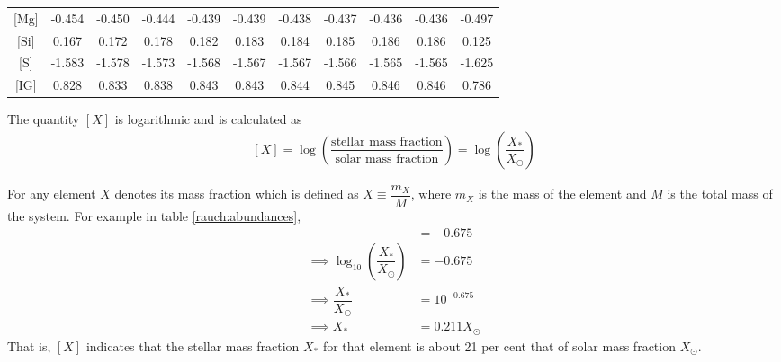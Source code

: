 \begin{table}[h!]
\begin{tabular}{ccccccccccc}
						{[}Mg{]} & \multicolumn{1}{c}{-0.454} & \multicolumn{1}{c}{-0.450} & \multicolumn{1}{c}{-0.444} & \multicolumn{1}{c}{-0.439} & \multicolumn{1}{c}{-0.439} & \multicolumn{1}{c}{-0.438} & \multicolumn{1}{c}{-0.437} & \multicolumn{1}{c}{-0.436} & \multicolumn{1}{c}{-0.436} & -0.497 \\ %
						{[}Si{]} & \multicolumn{1}{c}{0.167} & \multicolumn{1}{c}{0.172} & \multicolumn{1}{c}{0.178} & \multicolumn{1}{c}{0.182} & \multicolumn{1}{c}{0.183} & \multicolumn{1}{c}{0.184} & \multicolumn{1}{c}{0.185} & \multicolumn{1}{c}{0.186} & \multicolumn{1}{c}{0.186} & 0.125 \\ %
						{[}S{]} & \multicolumn{1}{c}{-1.583} & \multicolumn{1}{c}{-1.578} & \multicolumn{1}{c}{-1.573} & \multicolumn{1}{c}{-1.568} & \multicolumn{1}{c}{-1.567} & \multicolumn{1}{c}{-1.567} & \multicolumn{1}{c}{-1.566} & \multicolumn{1}{c}{-1.565} & \multicolumn{1}{c}{-1.565} & -1.625 \\ %
						{[}IG{]} & \multicolumn{1}{c}{0.828} & \multicolumn{1}{c}{0.833} & \multicolumn{1}{c}{0.838} & \multicolumn{1}{c}{0.843} & \multicolumn{1}{c}{0.843} & \multicolumn{1}{c}{0.844} & \multicolumn{1}{c}{0.845} & \multicolumn{1}{c}{0.846} & \multicolumn{1}{c}{0.846} & 0.786 \\ \hline
					\end{tabular}
				\end{table}
				
				The quantity $[X]$ is logarithmic and is calculated as
				\begin{align}
					\label{rauch:[X]}
					[X]=\log{\left(\dfrac{\text{stellar mass fraction}}{\text{solar mass fraction}}\right)}=\log{\left(\dfrac{X_*}{X_\odot}\right)}
				\end{align}
				
				For any element $X$ denotes its mass fraction which is defined as $X\equiv\dfrac{m_X}{M}$, where $m_X$ is the mass of the element and $M$ is the total mass of the system. For example in table \ref{rauch:abundances},
				\begin{align*}
					[X]&=-0.675 \\
					\implies \log_{10}\left(\dfrac{X_*}{X_\odot}\right)&=-0.675 \\
					\implies \dfrac{X_*}{X_\odot}&=10^{-0.675} \\
					\implies X_*&=0.211X_\odot
				\end{align*}
				That is, $[X]$ indicates that the stellar mass fraction $X_*$ for that element is about 21 per cent that of solar mass fraction $X_\odot$.
				
